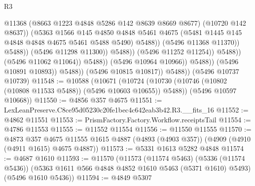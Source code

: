\begin{lexlean}{R3}
\begin{coremodule}
                                                  @11368
                                                  (@8663 @1223 @4848 @5286 @142 @8639 @8669 @8677)
                                                  (@10720 @142 @8637))
                                                (@5363
                                                  @1566
                                                  @145
                                                  @4850
                                                  @4848
                                                  @5461
                                                  @4675
                                                  (@5481
                                                    @1445
                                                    @145
                                                    @4848
                                                    @4848
                                                    @4675
                                                    @5461
                                                    @5488
                                                    @5490)
                                                  @5488))
                                              (@5496 @11368 @11370))
                                            @5488))
                                        (@5496 @11298 @11300))
                                      @5488))
                                  (@5496 @11252 @11254))
                                @5488))
                            (@5496 @11062 @11064))
                          @5488))
                      (@5496 @10964 @10966))
                    @5488))
                (@5496 @10891 @10893))
              @5488))
          (@5496 @10815 @10817))
        @5488))
    (@5496 @10737 @10739)
@11548 := @10588
    (@10671
      (@10724 (@10730 (@10746 (@10802 (@10808 @11533 @5488)) (@5496 @10603 @10655)) @5488))
      (@5496 @10597 @10668))
@11550 := @4856 @357 @4675
@11551 := LexLeanPreserve.C8ce95d05230c20fe1bec4c642eab3b42.R3.__fits_16
@11552 := @4862 @11551
@11553 := PrismFactory.Factory.Workflow.receiptsTail
@11554 := @4786 @11553
@11555 := @11552 @11554
@11556 := @11550 @11555
@11570 := @4873
    @357
    @4675
    @11555
    @1615
    @4887
    (@4893 (@4903 @357))
    (@4909 (@4910 (@4911 @1615) @4675 @4887))
@11573 := @5331 @1613 @5282 @4848
@11574 := @4687 @1610
@11593 := @11570
    (@11573
      (@11574 @5463)
      (@5336 (@11574 @5436))
      (@5363 @1611 @566 @4848 @4852 @1610 @5463 (@5371 @1610) @5493)
      (@5496 @1610 @5436))
@11594 := @4849 @5307

\end{coremodule}
\end{lexlean}
